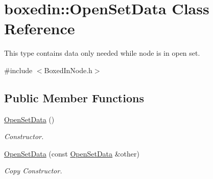 \hypertarget{classboxedin_1_1OpenSetData}{\section{boxedin\+:\+:Open\+Set\+Data Class Reference}
\label{classboxedin_1_1OpenSetData}
}


This type contains data only needed while node is in open set.  




{\ttfamily \#include $<$Boxed\+In\+Node.\+h$>$}

\subsection*{Public Member Functions}
\begin{DoxyCompactItemize}
\item 
\hypertarget{classboxedin_1_1OpenSetData_a575cf4b9245912bfdd162d363acdb2b4}{\hyperlink{classboxedin_1_1OpenSetData_a575cf4b9245912bfdd162d363acdb2b4}{Open\+Set\+Data} ()}\label{classboxedin_1_1OpenSetData_a575cf4b9245912bfdd162d363acdb2b4}

\begin{DoxyCompactList}\small\item\em Constructor. \end{DoxyCompactList}\item 
\hypertarget{classboxedin_1_1OpenSetData_afe57fb5e9556b200348e6c1777616faa}{\hyperlink{classboxedin_1_1OpenSetData_afe57fb5e9556b200348e6c1777616faa}{Open\+Set\+Data} (const \hyperlink{classboxedin_1_1OpenSetData}{Open\+Set\+Data} \&other)}\label{classboxedin_1_1OpenSetData_afe57fb5e9556b200348e6c1777616faa}

\begin{DoxyCompactList}\small\item\em Copy Constructor. \end{DoxyCompactList}\end{DoxyCompactItemize}
